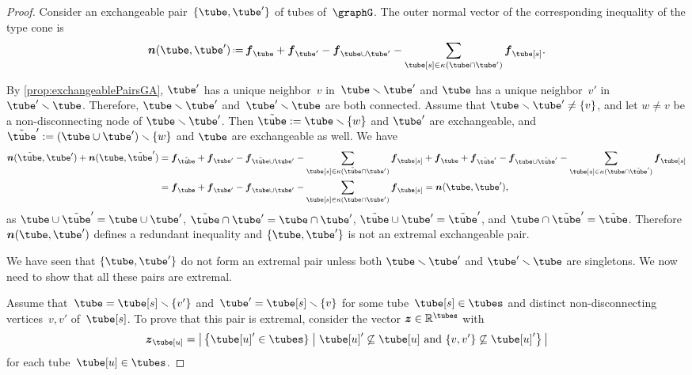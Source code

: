 \documentclass{amsart}
\theoremstyle{definition}
\newcommand{\R}{\mathbb{R}} %
\renewcommand{\b}[1]{{\boldsymbol{#1}}} %
\newcommand{\set}[2]{\left\{ #1 \;\middle|\; #2 \right\}} %
\newcommand{\ssm}{\smallsetminus} %
\newcommand{\eqdef}{\mbox{\,\raisebox{0.2ex}{\scriptsize\ensuremath{\mathrm:}}\ensuremath{=}\,}} %
\newcommand{\connectedComponents}{\kappa} %
\begin{document}
\begin{proof}
Consider an exchangeable pair~$\{\tube, \tube'\}$ of tubes of~$\graphG$.
The outer normal vector of the corresponding inequality of the type cone is
\[
\b{n}(\tube, \tube') \eqdef \b{f}_{\tube} + \b{f}_{\tube'} - \b{f}_{\tube\cup \tube'} - \sum_{\tube[s] \in \connectedComponents(\tube \cap \tube')} \b{f}_{\tube[s]}.
\]


By \cref{prop:exchangeablePairsGA}, $\tube'$ has a unique neighbor~$v$ in~$\tube \ssm \tube'$ and $\tube$ has a unique neighbor~$v'$ in~$\tube' \ssm \tube$.
Therefore, $\tube \ssm \tube'$ and~$\tube' \ssm \tube$ are both connected. Assume that $\tube \ssm \tube'\neq \{v\}$, and let $w\neq v$ be a non-disconnecting node of $\tube \ssm \tube'$. Then $\tilde \tube:=\tube \ssm \{w\}$ and $\tube'$ are exchangeable, and $\tilde \tube':=(\tube \cup \tube')\ssm \{w\}$ and $\tube$ are exchangeable as well. We have
\begin{align*}
\b{n}(\tilde \tube, \tube')+\b{n}( \tube, \tilde \tube') &=\b{f}_{\tilde \tube} + \b{f}_{\tube'} - \b{f}_{\tilde \tube\cup \tube'} - \sum_{\tube[s] \in \connectedComponents(\tilde \tube \cap \tube')} \b{f}_{\tube[s]} 
+ \b{f}_{\tube} + \b{f}_{\tilde \tube'} - \b{f}_{\tube\cup \tilde \tube'} - \sum_{\tube[s] \in \connectedComponents(\tube \cap \tilde \tube')} \b{f}_{\tube[s]} \\
&= \b{f}_{\tube} + \b{f}_{\tube'} - \b{f}_{\tube\cup \tube'} - \sum_{\tube[s] \in \connectedComponents(\tube \cap \tube')} \b{f}_{\tube[s]} =\b{n}(\tube, \tube'),
\end{align*}
as $\tube \cup \tilde \tube'=\tube \cup \tube'$, $\tilde \tube \cap \tube'=\tube \cap \tube'$, $\tilde \tube \cup \tube '=\tilde \tube '$,  and $\tube \cap \tilde \tube '=\tilde \tube$.
Therefore $\b{n}(\tube, \tube')$ defines a redundant inequality and $\{\tube, \tube'\}$ is not an extremal exchangeable pair.

We have seen that $\{\tube, \tube'\}$ do not form an extremal pair unless both $\tube\ssm \tube'$ and $\tube'\ssm \tube$ are singletons. We now need to show that all these pairs are extremal.

Assume that~$\tube=\tube[s] \ssm \{v'\}$ and~$\tube'=\tube[s] \ssm \{v\}$ for some tube~$\tube[s] \in \tubes$ and distinct non-disconnecting vertices~$v,v'$ of~$\tube[s]$. 
To prove that this pair is extremal, consider the vector $\b{z}\in\R^{\tubes}$ with 
\[\b{z}_{\tube[u]}=\big|\set{\tube[u]'\in \tubes\}}{\tube[u]'\not\subseteq \tube[u]\text{ and } \{v,v'\}\not\subseteq\tube[u]'}\big|\]
for each tube~$\tube[u]\in\tubes$.


\end{proof}
\end{document}
